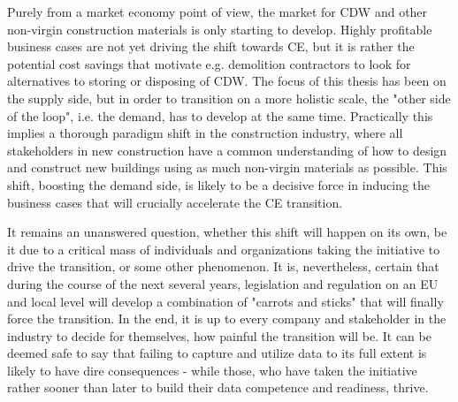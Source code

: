 \documentclass[english, 12pt, a4paper, sci, utf8, a-2b, online]{aaltothesis}
\begin{document}
Purely from a market economy point of view, the market for CDW and other non-virgin construction materials is only starting to develop. Highly profitable business cases are not yet driving the
shift towards CE, but it is rather the potential cost savings that motivate e.g. demolition contractors to look for alternatives to storing or disposing of CDW. The focus of this thesis has been
on the supply side, but in order to transition on a more holistic scale, the "other side of the loop", i.e. the demand, has to develop at the same time. Practically this implies a thorough
paradigm shift in the construction industry, where all stakeholders in new construction have a common understanding of how to design and construct new buildings using as much non-virgin materials
as possible. This shift, boosting the demand side, is likely to be a decisive force in inducing the business cases that will crucially accelerate the CE transition.

It remains an unanswered question, whether this shift will happen on its own, be it due to a critical mass of individuals and organizations taking the initiative to drive the transition, or some
other phenomenon. It is, nevertheless, certain that during the course of the next several years, legislation and regulation on an EU and local level will develop a combination of
"carrots and sticks" that will finally force the transition. In the end, it is up to every company and stakeholder in the industry to decide for themselves, how painful the transition will
be. It can be deemed safe to say that failing to capture and utilize data to its full extent is likely to have dire consequences - while those, who have taken the initiative rather sooner
than later to build their data competence and readiness, thrive.

\clearpage







\end{document}
